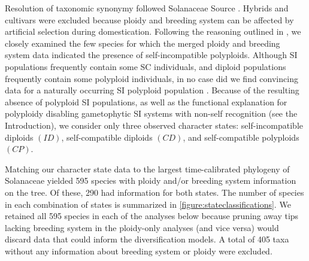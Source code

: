 Resolution of taxonomic synonymy followed Solanaceae Source \citep{solsource}. 
Hybrids and cultivars were excluded because ploidy and breeding system can be affected by artificial selection during domestication.
Following the reasoning outlined in \citet{robertson_2011}, we closely examined the few species for which the merged ploidy and breeding system data indicated the presence of self-incompatible polyploids.
Although SI populations frequently contain some SC individuals, and diploid populations frequently contain some polyploid individuals, in no case did we find convincing data for a naturally occurring SI polyploid population  \citep[discussed in][]{robertson_2011}.
Because of the resulting absence of polyploid SI populations, as well as the functional explanation for polyploidy disabling gametophytic SI systems with non-self recognition (see the Introduction), we consider only three observed character states: self-incompatible diploids $(ID)$, self-compatible diploids $(CD)$, and self-compatible polyploids $(CP)$.

Matching our character state data to the largest time-calibrated phylogeny of Solanaceae \citep{sarkinen_2013} yielded 595 species with ploidy and/or breeding system information on the tree.
Of these, 290 had information for both states.
The number of species in each combination of states is summarized in \cref{figure:stateclassifications}.
We retained all 595 species in each of the analyses below because pruning away tips lacking breeding system in the ploidy-only analyses (and vice versa) would discard data that could inform the diversification models.
A total of 405 taxa without any information about breeding system or ploidy were excluded.

